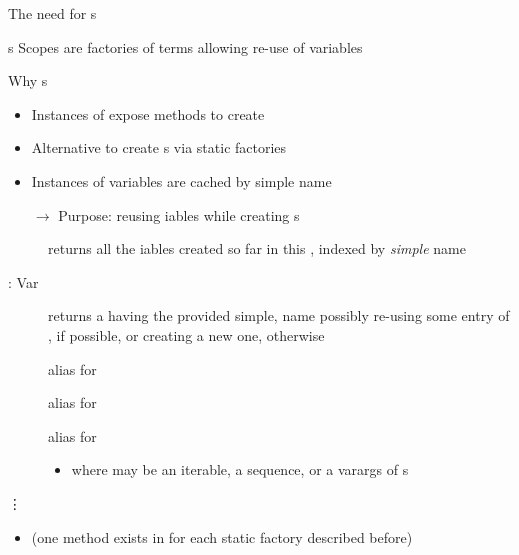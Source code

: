 \documentclass[handout]{beamer}
\begin{document}
\begin{frame}[allowframebreaks]{The need for s}
    \begin{block}{s}\centering
        Scopes are \alert{factories} of terms allowing re-use of variables
    \end{block}

    \begin{alertblock}{Why s}
        \begin{itemize}
            \item Instances of  expose methods to create 
            \item Alternative to create s via \alert{static factories}
            \item Instances of variables are cached \alert{by simple name}
            \item[$\rightarrow$] Purpose: reusing iables while creating s
        \end{itemize}
    \end{alertblock}

    \begin{description}
        \item[] returns all the iables created so far in this , indexed by \emph{simple} name
        \item[: Var] returns a  having the provided simple, name possibly re-using some entry of , if possible, or creating a new one, otherwise
        \item[] alias for 
        \item[] alias for 
        \item[] alias for 
        \begin{itemize}\small
            \item where  may be an iterable, a sequence, or a varargs of s
        \end{itemize}
        \item[\vdots]
    \end{description}
    \begin{itemize}
        \item (one method exists in  for each static factory described before)
    \end{itemize}


\end{frame}
\end{document}
